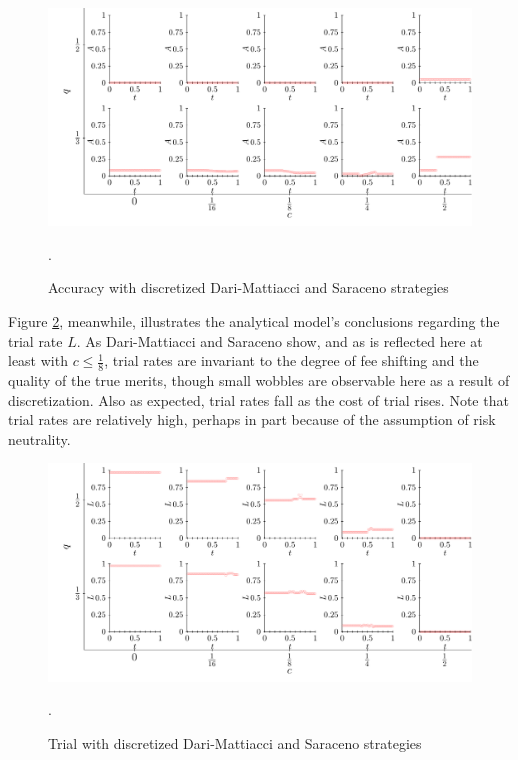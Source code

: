 \documentclass{article}
\begin{document}
\begin{figure}[h!]
\centering
\includegraphics[scale=0.60, trim={0.05in 0.15in 0in 0in}, clip]{../Figures/DMS formulas accuracy.pdf}
\caption{Accuracy with discretized Dari-Mattiacci and Saraceno strategies}. 
\label{fig:dmsaccuracy}
\end{figure}

Figure \ref{fig:dmstrial}, meanwhile, illustrates the analytical model's conclusions regarding the trial rate $L$. As Dari-Mattiacci and Saraceno show, and as is reflected here at least with $c \leq \frac{1}{8}$, trial rates are invariant to the degree of fee shifting and the quality of the true merits, though small wobbles are observable here as a result of discretization. Also as expected, trial rates fall as the cost of trial rises. Note that trial rates are relatively high, perhaps in part because of the assumption of risk neutrality.

\begin{figure}[h!]
\centering
\includegraphics[scale=0.60, trim={0.05in 0.15in 0in 0in}, clip]{../Figures/DMS formulas trial.pdf}
\vspace*{-2mm}
\caption{Trial with discretized Dari-Mattiacci and Saraceno strategies}. 
\label{fig:dmstrial}
\end{figure}
\end{document}
